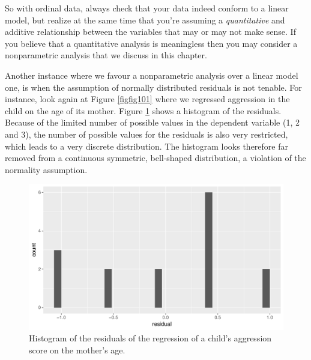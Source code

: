 \documentclass[]{book}\usepackage[]{graphicx}\usepackage[]{color}
\makeatletter
\def\maxwidth{ %
  \ifdim\Gin@nat@width>\linewidth
    \linewidth
  \else
    \Gin@nat@width
  \fi
}
\newenvironment{knitrout}{}{} %
\makeatother
\begin{document}
So with ordinal data, always check that your data indeed conform to a linear model, but realize at the same time that you're assuming a \textit{quantitative} and additive relationship between the variables that may or may not make sense. If you believe that a quantitative analysis is meaningless then you may consider a nonparametric analysis that we discuss in this chapter. 

Another instance where we favour a nonparametric analysis over a linear model one, is when the assumption of normally distributed residuals is not tenable. For instance, look again at Figure \ref{figfig101} where we regressed aggression in the child on the age of its mother. Figure \ref{fig:fig1201} shows a histogram of the residuals. Because of the limited number of possible values in the dependent variable (1, 2 and 3), the number of possible values for the residuals is also very restricted, which leads to a very discrete distribution. The histogram looks therefore far removed from a continuous symmetric, bell-shaped distribution, a violation of the normality assumption. 

\begin{knitrout}
\color{fgcolor}\begin{figure}

{\centering \includegraphics[width=\maxwidth]{figure/fig1201-1} 

}

\caption[Histogram of the residuals of the regression of a child's aggression score on the mother's age]{Histogram of the residuals of the regression of a child's aggression score on the mother's age.}\label{fig:fig1201}
\end{figure}


\end{knitrout}
\end{document}
